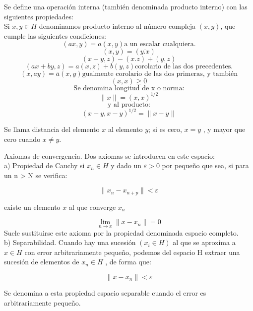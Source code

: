 \begin{axi}
	Se define una operación interna (también denominada producto interno) con las siguientes propiedades:
\\
	
	Si $x, y \in{H}$ denominamos producto interno al número compleja $(x, y)$, que cumple
las siguientes condiciones:
\\
		
		
		\[ (ax, y)= a(x, y) \text{a un escalar cualquiera.}\] 
		 \[(x, y ) = ( \overline{y.x} ) \]
        \begin{equation}
        (x + y, z) - (x.z ) + (y, z )  
        \end{equation}      
        \[ (ax + by, z)= a( x, z)+ b( y, z) \text{corolario de las dos precedentes.} \] 
		\[(x, ay )= \overline{a}(x, y) \text{gualmente corolario de las dos primeras, y también}\]
		\[( x, x ) \geq 0\]
		\[\text{Se denomina longitud de x o norma:}\] 
	    \begin{equation}
	    	\parallel x \parallel = (x, x )^{1/2}
	    \end{equation}
		\[\text{y al producto:}\]
		\begin{equation}
			(x-y, x-y )^{1/2} = \parallel x -y \parallel
		\end{equation}
		
		Se llama distancia del elemento $ x $ al elemento $ y $; si es cero, $x=y$ , y mayor que cero cuando $x \not = y$.
\end{axi}

\begin{axi}
	Axiomas de convergencia. Dos axiomas se introducen en este espacio:\\
	
	a) Propiedad de Cauchy  si  $x_{n} \in H$ y dado un $ \varepsilon > 0 $ por pequeño que sea, si para
	un  n > N se verifica:
	
	\begin{equation}
		\parallel  x_{n}  - x_{n+p} \parallel < \varepsilon 
	\end{equation}
	
	 existe un elemento $x$ al que converge $ x_{n} $
	 
	 \begin{equation}
	 \lim\limits_{n \rightarrow x} \parallel x - x_{n} \parallel = 0
	 \end{equation}
	 Suele sustituirse este axioma por la propiedad denominada espacio completo.\\
	 
	 b) Separabilidad. Cuando hay una sucesión $(x_{i} \in H)$ al que se aproxima a $x \in H$ con error arbitrariamente pequeño, podemos del espacio H extraer una sucesión de elementos de $  x_{n} \in H $ , de forma que:
	 
	 	\begin{equation}
	 \parallel  x  - x_{n} \parallel < \varepsilon 
	 \end{equation}
	 
	 Se denomina a esta propiedad espacio separable cuando el error es arbitrariamente pequeño. 
\end{axi}

